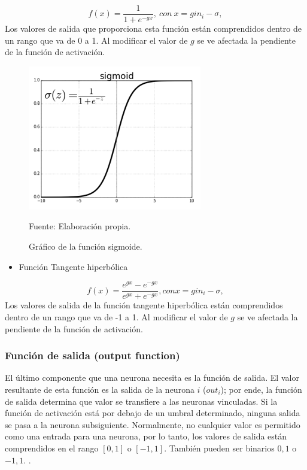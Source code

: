 \begin{equation}
f(x)= \frac{1}{1+e^{-gx}}, \ con \ x=gin_{i}-\sigma,
\label{funcionSigmoidea}
\end{equation}
Los valores de salida que proporciona esta función están comprendidos dentro de un rango que va de 0 a 1. Al
modificar el valor de $g$ se ve afectada la pendiente de la función de activación. 

\begin{figure}[h!]
	\centering
		\includegraphics[scale=0.6]{imagenes/Funcionsigmoidea.png}
		\caption{Gráfico de la función sigmoide.}
		\begin{center}
    Fuente: Elaboración propia.
    \end{center}
	\label{fig:Funcionsigmoidea}
\end{figure}
\begin{itemize}
    \item Función Tangente hiperbólica
\end{itemize}

\begin{equation}
f(x)= \frac{e^{gx}-e^{-gx}}{e^{gx}+e^{-gx}}, con x=gin_{i}-\sigma,
\end{equation}
Los valores de salida de la función tangente hiperbólica están comprendidos dentro de un rango que va de -1 a 1. Al modificar el valor de $g$ se ve afectada la pendiente de la función de activación. 

\subsubsection{Función de salida (output function)}
El último componente que una neurona necesita es la función de salida. El valor resultante de esta función es la salida de la neurona $i$ ($out_{i}$); por ende, la función de salida determina que valor se transfiere a las neuronas vinculadas. Si la función de
activación está por debajo de un umbral determinado, ninguna salida se pasa a la neurona subsiguiente. Normalmente, no cualquier valor es permitido como una entrada para una neurona, por lo tanto, los valores de salida están comprendidos en el rango
$[0, 1]$ o $[-1, 1]$. También pueden ser binarios ${0, 1}$ o ${-1, 1}$. \citep{matich2001redes}.

